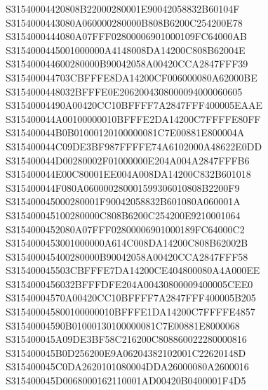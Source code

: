 \documentclass[12pt,a4paper]{article}
\begin{document}
\begin{framed}
{S31540004420808B22000280001E90042058832B60104F\newline
S3154000443080A060000280000B808B6200C254200E78\newline
S3154000444080A07FFF02800006901000109FC64000AB\newline
S3154000445001000000A4148008DA14200C808B62004E\newline
S315400044600280000B90042058A00420CCA2847FFF39\newline
S315400044703CBFFFE8DA14200CF006000080A62000BE\newline
S3154000448032BFFFE0E2062004308000094000060605\newline
S31540004490A00420CC10BFFFF7A2847FFF400005EAAE\newline
S315400044A00100000010BFFFE2DA14200C7FFFFE80FF\newline
S315400044B0B01000120100000081C7E00881E800004A\newline
S315400044C09DE3BF987FFFFE74A6102000A48622E0DD\newline
S315400044D00280002F01000000E204A004A2847FFFB6\newline
S315400044E00C80001EE004A008DA14200C832B601018\newline
S315400044F080A060000280001599306010808B2200F9\newline
S315400045000280001F90042058832B601080A060001A\newline
S315400045100280000C808B6200C254200E9210001064\newline
S3154000452080A07FFF02800006901000189FC64000C2\newline
S3154000453001000000A614C008DA14200C808B62002B\newline
S315400045400280000B90042058A00420CCA2847FFF58\newline
S315400045503CBFFFE7DA14200CE404800080A4A000EE\newline
S3154000456032BFFFDFE204A00430800009400005CEE0\newline
S31540004570A00420CC10BFFFF7A2847FFF400005B205\newline
S315400045800100000010BFFFE1DA14200C7FFFFE4857\newline
S31540004590B01000130100000081C7E00881E8000068\newline
S315400045A09DE3BF58C216200C808860022280000816\newline
S315400045B0D256200E9A06204382102001C22620148D\newline
S315400045C0DA2620101080004DDA26000080A2600016\newline
S315400045D0068000162110001AD00420B0400001F4D5\newline
}
\end{framed}
\end{document}
